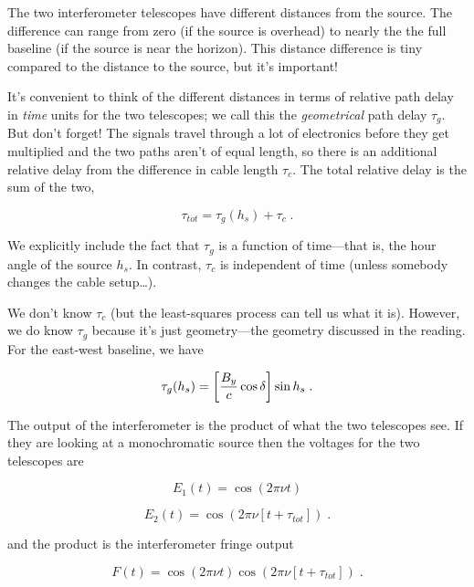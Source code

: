 \documentclass[11pt,preprint]{aastex}
\begin{document}
	The two interferometer telescopes have different distances from
the source. The difference can range from zero (if the source is
overhead) to nearly the the full baseline (if the source is near the
horizon). This distance difference is tiny compared to the distance to
the source, but it's important! 

	It's convenient to think of the different distances in terms of 
relative path delay in {\it time} units for the two telescopes; we call
this the {\it geometrical} path delay $\tau_g$.  But don't forget! The
signals travel through a lot of electronics before they get multiplied
and the two paths aren't of equal length, so there is an additional
relative delay from the difference in cable length $\tau_c$.  The total
relative delay is the sum of the two,

\begin{equation}
 \tau_{tot} = \tau_g(h_s) + \tau_c \; . 
\end{equation}


\noindent We explicitly include the fact that $\tau_g$ is a function of
time---that is, the hour angle of the source $h_s$. In contrast, $\tau_c$ is
independent of time (unless somebody changes the cable setup\dots).

	We don't know $\tau_c$ (but the least-squares process can tell
us what it is).  However, we do know $\tau_g$ because it's just
geometry---the geometry discussed in the reading.  For the east-west
baseline, we have

\begin{equation}
 \tau_g(h_s) = \left[{B_y \over c} \cos \delta \right] \sin h_s \; . 
\end{equation}


	The output of the interferometer is the product of what the two
telescopes see. If they are looking at a monochromatic source then the
voltages for the two telescopes are

\begin{equation}
 E_1(t) = \cos (2 \pi \nu t) 
\end{equation}


\begin{equation}
 E_2(t) = \cos (2 \pi \nu [t + \tau_{tot}]) \; . 
\end{equation}


\noindent and the product is the interferometer fringe output

\begin{equation}
 F(t) = \cos (2 \pi \nu t) \cos (2 \pi \nu [t + \tau_{tot}]) \; . 
\end{equation}
\end{document}
